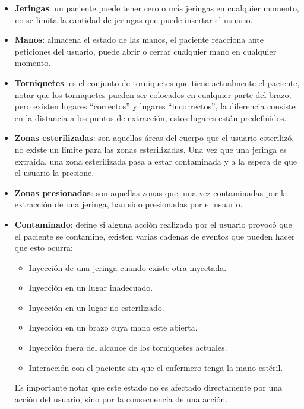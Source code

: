 \begin{itemize}
    \item \textbf{Jeringas}: un paciente puede tener cero o más jeringas en
        cualquier momento, no se limita la cantidad de jeringas que puede
        insertar el usuario.
    \item \textbf{Manos}: almacena el estado de las manos, el paciente reacciona
        ante peticiones del usuario, puede abrir o cerrar cualquier mano en
        cualquier momento.
    \item \textbf{Torniquetes}: es el conjunto de torniquetes que tiene
        actualmente el paciente, notar que los torniquetes pueden ser colocados
        en cualquier parte del brazo, pero existen lugares \enquote{correctos} y
        lugares \enquote{incorrectos}, la diferencia consiste en la distancia a
        los puntos de extracción, estos lugares están predefinidos.
    \item \textbf{Zonas esterilizadas}: son aquellas áreas del cuerpo que el
        usuario esterilizó, no existe un límite para las zonas esterilizadas.
        Una vez que una jeringa es extraída, una zona esterilizada pasa a estar
        contaminada y a la espera de que el usuario la presione.
    \item \textbf{Zonas presionadas}: son aquellas zonas que, una vez
        contaminadas por la extracción de una jeringa, han sido presionadas por
        el usuario.
    \item \textbf{Contaminado}: define si alguna acción realizada por el usuario
        provocó que el paciente se contamine, existen varias cadenas de eventos
        que pueden hacer que esto ocurra:
        \begin{itemize}
            \item Inyección de una jeringa cuando existe otra inyectada.
            \item Inyección en un lugar inadecuado.
            \item Inyección en un lugar no esterilizado.
            \item Inyección en un brazo cuya mano este abierta.
            \item Inyección fuera del alcance de los torniquetes actuales.
            \item Interacción con el paciente sin que el enfermero tenga la mano
                estéril.
        \end{itemize}
        Es importante notar que este estado no es afectado directamente por una
        acción del usuario, sino por la consecuencia de una acción.
\end{itemize}

